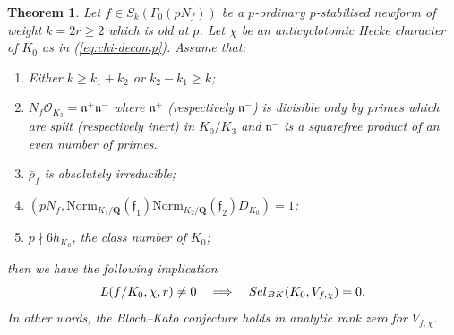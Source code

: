 \documentclass[10pt,letterpaper]{amsart}
\theoremstyle{plain}
\newtheorem{thm}{Theorem}[subsection] %
\theoremstyle{definition}
\theoremstyle{definition}
\theoremstyle{plain}
\theoremstyle{plain}
\theoremstyle{plain}
\theoremstyle{remark}
\numberwithin{equation}{section}
\newcommand{\fkn}{\mathfrak{n}}
\def\cO{\mathcal O}
\newcommand{\Q}{\mathbf{Q}}
\begin{document}
 
\begin{thm}\label{thm:BK-def}
Let $f\in S_k(\Gamma_0(pN_f))$ be a $p$-ordinary $p$-stabilised newform of weight $k=2r\geq 2$ which is old at $p$. Let $\chi$ be an anticyclotomic Hecke character of $K_0$ as in (\ref{eq:chi-decomp}). Assume that:
\begin{enumerate}
    \item Either $k\ge k_1+k_2$ or $k_2-k_1\ge k$; 
    \item $N_f\cO_{K_3}=\mathfrak{n}^+\mathfrak{n}^-$ where $\fkn^+$
(respectively $\fkn^-$) is divisible only by primes which are split (respectively inert) in $K_0/K_3$ and $\fkn^-$ is a squarefree product of an even number of primes.
    \item $\bar{\rho}_f$ is absolutely irreducible; 
    \item $(pN_f,\mathrm{Norm}_{K_1/\Q}(\mathfrak{f}_1)\mathrm{Norm}_{K_2/\Q}(\mathfrak{f}_2)D_{K_0})=1$;
    \item $p\nmid 6h_{K_0}$, the class number of $K_0$;
\end{enumerate}
then we have the following implication
\[
L(f/K_0,\chi,r)\neq 0\quad\Longrightarrow\quad{\rm Sel}_{\rm BK}(K_0,V_{f,\chi})=0.
\] 
In other words, the Bloch--Kato conjecture holds in analytic rank zero for $V_{f,\chi}$.
\end{thm}
\end{document}
